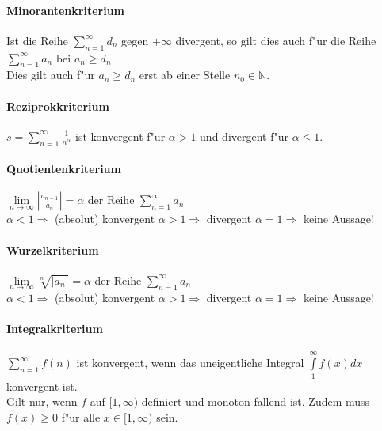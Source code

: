 \paragraph{Minorantenkriterium}
  Ist die Reihe $ \sum\limits_{n=1}^{\infty} d_n $ gegen $+\infty$ divergent, so
  gilt dies auch f"ur die Reihe $ \sum\limits_{n=1}^{\infty} a_n $ bei $a_n \geq d_n$. \\ Dies gilt auch f"ur $a_n \geq d_n$ erst ab einer Stelle $n_0 \in \mathbb{N}$.

\paragraph{Reziprokkriterium}
  $ s = \sum\limits_{n=1}^{\infty} \frac{1}{n^\alpha} $ ist konvergent f"ur
  $\alpha > 1$ und divergent f"ur $\alpha \leq 1$.

\paragraph{Quotientenkriterium}
  $ \lim\limits_{n \to \infty} \left|\frac{a_{n+1}}{a_n}\right| = \alpha $ der
Reihe $ \sum\limits_{n=1}^{\infty} a_n $ \\ $\alpha < 1 \Rightarrow$ (absolut) konvergent \hspace{3cm}
  $\alpha > 1 \Rightarrow$ divergent \hspace{4cm} 
  $\alpha = 1 \Rightarrow$ keine Aussage!

\paragraph{Wurzelkriterium}
  $ \lim\limits_{n \to \infty} \sqrt[n]{\left|a_n\right|} = \alpha $ der Reihe $
\sum\limits_{n=1}^{\infty} a_n $ \\ $\alpha < 1 \Rightarrow$ (absolut) konvergent\hspace{3cm}
  $\alpha > 1 \Rightarrow$ divergent \hspace{4cm} 
  $\alpha = 1 \Rightarrow$ keine Aussage!

\paragraph{Integralkriterium}
  $ \sum\limits_{n=1}^{\infty} f(n) $ ist konvergent, wenn das uneigentliche
Integral $ \int\limits_{1}^{\infty} f(x) dx $ konvergent ist. \\ Gilt nur, wenn $f$ auf $ [1, \infty) $ definiert und monoton fallend ist. Zudem muss $ f(x) \geq 0 $ f"ur alle $x \in [1, \infty)$ sein.
 
